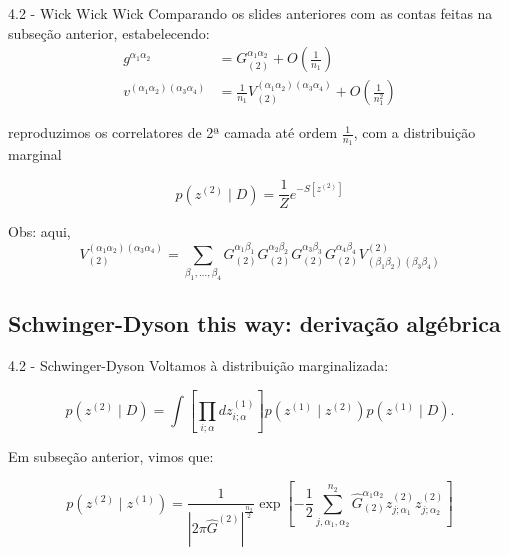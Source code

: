 \documentclass{beamer}
\begin{document}
\begin{frame}{4.2 - Wick Wick Wick}
    \small
    Comparando os slides anteriores com as contas feitas na subseção anterior, estabelecendo:
    \begin{align*}
        g^{\alpha_1\alpha_2} &= G_{(2)}^{\alpha_1\alpha_2} + O(\frac{1}{n_1}) \\
        v^{(\alpha_1\alpha_2)(\alpha_3\alpha_4)} &= \frac{1}{n_1} V_{(2)}^{(\alpha_1\alpha_2)(\alpha_3\alpha_4)} + O(\frac{1}{n_1^2})
    \end{align*}

    reproduzimos os correlatores de 2ª camada até ordem $\frac{1}{n_1}$, com a distribuição marginal

    \begin{equation*}
        p(z^{(2)} \mid D) = \frac{1}{Z} e^{- S[z^{(2)}]}
    \end{equation*}
    \pause

    Obs: aqui, \begin{equation*}
        V_{(2)}^{(\alpha_1\alpha_2)(\alpha_3\alpha_4)} = \sum_{\beta_1, \dots, \beta_4} G_{(2)}^{\alpha_1\beta_1} G_{(2)}^{\alpha_2\beta_2} G_{(2)}^{\alpha_3\beta_3} G_{(2)}^{\alpha_4\beta_4} V^{(2)}_{(\beta_1\beta_2)(\beta_3\beta_4)}
    \end{equation*}
\end{frame}


\subsection{Schwinger-Dyson this way: derivação algébrica}
\begin{frame}
\tableofcontents[currentsubsection]
\end{frame}

\begin{frame}{4.2 - Schwinger-Dyson}
    Voltamos à distribuição marginalizada:

    \begin{equation*}
        p(z^{(2)} \mid D) = \int \left[\prod_{i;\alpha} dz^{(1)}_{i;\alpha}\right]p(z^{(1)} \mid z^{(2)}) p(z^{(1)} \mid D).
    \end{equation*}

    \pause
    
    Em subseção anterior, vimos que:

    \begin{equation*}
        p(z^{(2)} \mid z^{(1)}) = \frac{1}{|2\pi \widehat G^{(2)}|^{\frac{n_2}{2}}} \exp \left[- \frac{1}{2} \sum_{j, \alpha_1, \alpha_2}^{n_2} \widehat G_{(2)}^{\alpha_1 \alpha_2} z^{(2)}_{j; \alpha_1} z^{(2)}_{j; \alpha_2}\right]
    \end{equation*} 
\end{frame}
\end{document}
